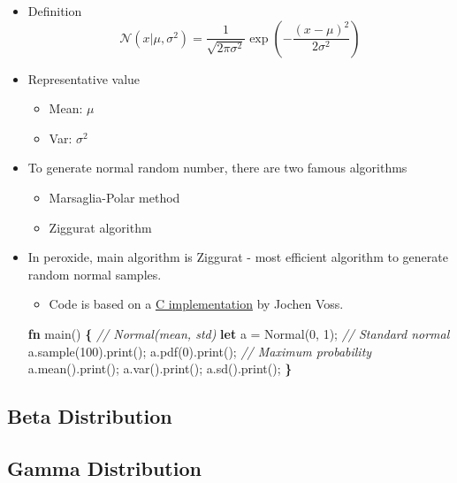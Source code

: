 \documentclass[]{book}
\newenvironment{Shaded}{\begin{snugshade}}{\end{snugshade}}
\newcommand{\CommentTok}[1]{\textcolor[rgb]{0.56,0.35,0.01}{\textit{#1}}}
\newcommand{\DecValTok}[1]{\textcolor[rgb]{0.00,0.00,0.81}{#1}}
\newcommand{\KeywordTok}[1]{\textcolor[rgb]{0.13,0.29,0.53}{\textbf{#1}}}
\newcommand{\NormalTok}[1]{#1}
\newcommand{\OperatorTok}[1]{\textcolor[rgb]{0.81,0.36,0.00}{\textbf{#1}}}
\providecommand{\tightlist}{%
  \setlength{\itemsep}{0pt}\setlength{\parskip}{0pt}}
\begin{document}
\begin{itemize}
\tightlist
\item
  Definition
  \[\mathcal{N}(x | \mu, \sigma^2) = \frac{1}{\sqrt{2\pi \sigma^2}} \exp{\left( - \frac{(x - \mu)^2}{2\sigma^2}\right)}\]
\item
  Representative value

  \begin{itemize}
  \tightlist
  \item
    Mean: \(\mu\)
  \item
    Var: \(\sigma^2\)
  \end{itemize}
\item
  To generate normal random number, there are two famous algorithms

  \begin{itemize}
  \tightlist
  \item
    Marsaglia-Polar method
  \item
    Ziggurat algorithm
  \end{itemize}
\item
  In peroxide, main algorithm is Ziggurat - most efficient algorithm to generate random normal samples.

  \begin{itemize}
  \tightlist
  \item
    Code is based on a \href{https://www.seehuhn.de/pages/ziggurat.html}{C implementation} by Jochen Voss.
  \end{itemize}

\begin{Shaded}
\begin{Highlighting}[]
\KeywordTok{fn}\NormalTok{ main() }\OperatorTok{\{}
    \CommentTok{// Normal(mean, std)}
    \KeywordTok{let}\NormalTok{ a = Normal(}\DecValTok{0}\NormalTok{, }\DecValTok{1}\NormalTok{); }\CommentTok{// Standard normal}
\NormalTok{    a.sample(}\DecValTok{100}\NormalTok{).print();}
\NormalTok{    a.pdf(}\DecValTok{0}\NormalTok{).print(); }\CommentTok{// Maximum probability}
\NormalTok{    a.mean().print();}
\NormalTok{    a.var().print();}
\NormalTok{    a.sd().print();}
\OperatorTok{\}}
\end{Highlighting}
\end{Shaded}
\end{itemize}

\hypertarget{beta-distribution}{%
\subsection{Beta Distribution}\label{beta-distribution}}

\hypertarget{gamma-distribution}{%
\subsection{Gamma Distribution}\label{gamma-distribution}}


\end{document}
